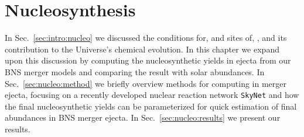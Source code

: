 
\chapter{Nucleosynthesis} \label{ch:nucleo}%




%
In Sec.~\ref{sec:intro:nucleo} we discussed the conditions for, and sites of,
\rproc{} \nuc{}, and its contribution to the Universe's chemical evolution. 
%
In this chapter we expand upon this discussion by computing the 
nucleosynthetic yields in ejecta from our \ac{BNS} merger models and 
comparing the result with solar abundances.
%
In Sec.~\ref{sec:nucleo:method} we briefly overview methods for computing  
\rproc{} \nuc{} in merger ejecta, focusing on 
a recently developed nuclear reaction network \texttt{SkyNet} 
\citep{Lippuner:2017tyn,Lippuner:2018phd} and how 
the final nucleosynthetic yields can be parameterized for quick 
estimation of final abundances in \ac{BNS} merger ejecta.
%
In Sec.~\ref{sec:nucleo:results} we present our results.


